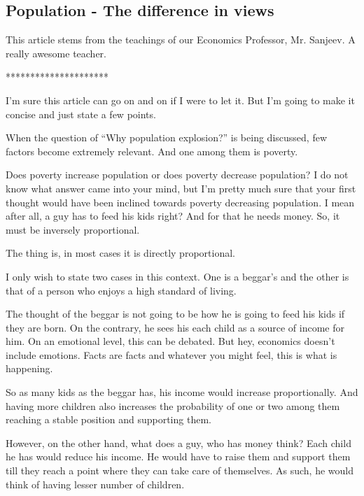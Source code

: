 \documentclass[twoside,11pt,titlepage]{article}
\begin{document}
\newpage
\begin{center}
  \section{Population - The difference in views}
\end{center}
\bigskip
\bigskip
\bigskip

This article stems from the teachings of our Economics Professor, Mr. Sanjeev. A really awesome teacher.

\bigskip
\begin{center}
*********************
\end{center}

I'm sure this article can go on and on if I were to let it. But I'm going to make it concise and just state a few points.

When the question of ``Why population explosion?'' is being discussed, few factors become extremely relevant. And one among them is poverty.

Does poverty increase population or does poverty decrease population? I do not know what answer came into your mind, but I'm pretty much sure that your first thought would have been inclined towards poverty decreasing population. I mean after all, a guy has to feed his kids right? And for that he needs money. So, it must be inversely proportional.

The thing is, in most cases it is directly proportional.

I only wish to state two cases in this context. One is a beggar's and the other is that of a person who enjoys a high standard of living.

The thought of the beggar is not going to be how he is going to feed his kids if they are born. On the contrary, he sees his each child as a source of income for him. On an emotional level, this can be debated. But hey, economics doesn't include emotions. Facts are facts and whatever you might feel, this is what is happening.

So as many kids as the beggar has, his income would increase proportionally. And having more children also increases the probability of one or two among them reaching a stable position and supporting them.

However, on the other hand, what does a guy, who has money think? Each child he has would reduce his income. He would have to raise them and support them till they reach a point where they can take care of themselves. As such, he would think of having lesser number of children.
\end{document}
